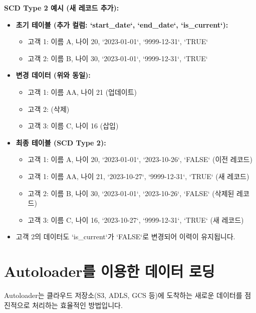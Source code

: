 \documentclass[11pt,a4paper]{article}
\begin{document}
\begin{examplebox}
\textbf{SCD Type 2 예시 (새 레코드 추가):}
\begin{itemize}
    \item \textbf{초기 테이블 (추가 컬럼: `start_date`, `end_date`, `is_current`):}
        \begin{itemize}
            \item 고객 1: 이름 A, 나이 20, `2023-01-01`, `9999-12-31`, `TRUE`
            \item 고객 2: 이름 B, 나이 30, `2023-01-01`, `9999-12-31`, `TRUE`
        \end{itemize}
    \item \textbf{변경 데이터 (위와 동일):}
        \begin{itemize}
            \item 고객 1: 이름 AA, 나이 21 (업데이트)
            \item 고객 2: (삭제)
            \item 고객 3: 이름 C, 나이 16 (삽입)
        \end{itemize}
    \item \textbf{최종 테이블 (SCD Type 2):}
        \begin{itemize}
            \item 고객 1: 이름 A, 나이 20, `2023-01-01`, `2023-10-26`, `FALSE` (이전 레코드)
            \item 고객 1: 이름 AA, 나이 21, `2023-10-27`, `9999-12-31`, `TRUE` (새 레코드)
            \item 고객 2: 이름 B, 나이 30, `2023-01-01`, `2023-10-26`, `FALSE` (삭제된 레코드)
            \item 고객 3: 이름 C, 나이 16, `2023-10-27`, `9999-12-31`, `TRUE` (새 레코드)
        \end{itemize}
    \item 고객 2의 데이터도 `is_current`가 `FALSE`로 변경되어 이력이 유지됩니다.
\end{itemize}
\end{examplebox}

\newpage
\section{Autoloader를 이용한 데이터 로딩}
Autoloader는 클라우드 저장소(S3, ADLS, GCS 등)에 도착하는 새로운 데이터를 점진적으로 처리하는 효율적인 방법입니다.
\end{document}
